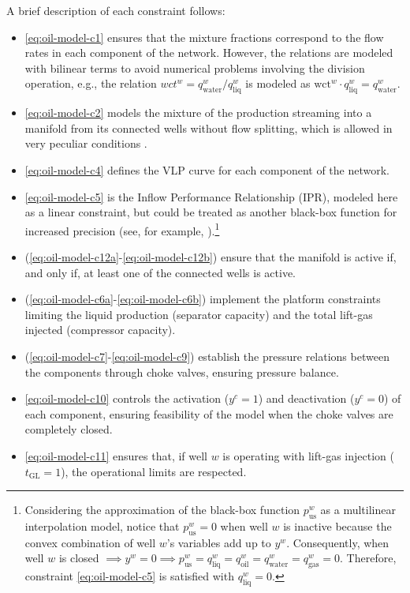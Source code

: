 \documentclass[pdflatex,sn-mathphys-num]{sn-jnl}%
\begin{document}
A brief description of each constraint follows:
\begin{itemize}
    \item \eqref{eq:oil-model-c1} ensures that the mixture fractions correspond to the flow rates in each component of the network. However, the relations are modeled with bilinear terms to avoid numerical problems involving the division operation, e.g., the relation $wct^w = q_{\text{water}}^w/q_{\text{liq}}^w$ is modeled as $\text{wct}^w\cdot q_{\text{liq}}^w = q_{\text{water}}^w$.
    
    \item \eqref{eq:oil-model-c2} models the mixture of the production streaming into a manifold from its connected wells without flow splitting, which is allowed in very peculiar conditions \citep{Camponogara:Flow-Split:2024}.
    
    \item \eqref{eq:oil-model-c4} defines the VLP curve for each component of the network.
    
    \item \eqref{eq:oil-model-c5} is the Inflow Performance Relationship (IPR), modeled here as a linear constraint, but could be treated as another black-box function for increased precision (see, for example, \cite{Vogel:JPT:1968}).\footnote{%
        Considering the approximation of the black-box function $p_{\text{us}}^{w}$ as a multilinear interpolation model, notice that $p_{\text{us}}^w=0$ when well $w$ is inactive because the convex combination of well $w$'s variables add up to $y^w$.  
        Consequently, when well $w$ is closed $\implies y^w=0 \implies p_{\text{us}}^w=q_{\text{liq}}^w=q_{\text{oil}}^w = q_{\text{water}}^w = q_{\text{gas}}^w=0$.
        Therefore, constraint \eqref{eq:oil-model-c5} is satisfied with $q_{\text{liq}}^{w}=0$.
    }

    \item \normalfont(\ref{eq:oil-model-c12a}-\ref{eq:oil-model-c12b}) ensure that the manifold is active if, and only if, at least one of the connected wells is active.
    
    \item \normalfont(\ref{eq:oil-model-c6a}-\ref{eq:oil-model-c6b}) implement the platform constraints limiting the liquid production (separator capacity) and the total lift-gas injected (compressor capacity).
    
    \item \normalfont(\ref{eq:oil-model-c7}-\ref{eq:oil-model-c9}) establish the pressure relations between the components through choke valves, ensuring pressure balance. 
    
    \item \eqref{eq:oil-model-c10} controls the activation ($y^c=1$) and deactivation ($y^{c}=0$) of each component, ensuring feasibility of the model when the choke valves are completely closed.
    
    \item \eqref{eq:oil-model-c11} ensures that, if well $w$ is operating with lift-gas injection ($t_{\text{GL}}=1$), the operational limits are respected.
\end{itemize}
\end{document}
